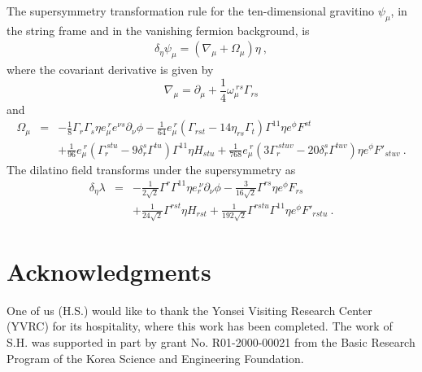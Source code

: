 \documentclass[a4paper,12pt]{article}
\begin{document}
The supersymmetry transformation rule for the ten-dimensional
gravitino $\psi_\mu$, in the string frame and in the vanishing fermion
background, is
\begin{eqnarray}
\delta_\eta \psi_\mu =  (\nabla_\mu + \Omega_\mu ) \eta~,  
\end{eqnarray} 
where the covariant derivative is given by
$$\nabla_\mu = \partial_\mu + \frac{1}{4} \omega_\mu^{~rs}
\Gamma_{rs}$$ and 
\begin{eqnarray}
\Omega_\mu 
 &=&
   -\frac{1}{8} \Gamma_r \Gamma_s \eta
        e_\mu^{~r} e^{\nu s} \partial_\nu \phi
  -\frac{1}{64} e_\mu^{~r} ( \Gamma_{rst}- 14 \eta_{rs} \Gamma_t)
     \Gamma^{11} \eta e^\phi F^{st}
                                                \nonumber \\
 & & +\frac{1}{96} e_\mu^{~r}
     (\Gamma_r^{~stu}-9 \delta_r^s \Gamma^{tu}) \Gamma^{11} \eta
      H_{stu}
     +\frac{1}{768} e_\mu^{~r}
     ( 3\Gamma_r^{~stuv}-20 \delta_r^s \Gamma^{tuv} ) \eta
     e^\phi F'_{stuv} ~.
\label{dpsi}
\end{eqnarray}
The dilatino field transforms under the supersymmetry as
\begin{eqnarray}
\delta_\eta \lambda
 &=& -\frac{1}{2 \sqrt{2} } \Gamma^r \Gamma^{11} \eta
            e_r^{~\nu} \partial_\nu \phi
    -\frac{3}{16 \sqrt{2} } \Gamma^{rs} \eta e^\phi F_{rs}
                                               \nonumber \\
 & & + \frac{1}{24 \sqrt{2}} \Gamma^{rst} \eta H_{rst}
    + \frac{1}{192 \sqrt{2} } \Gamma^{rstu} \Gamma^{11}
            \eta  e^\phi F'_{rstu} ~.
                                               \label{dlam}
\end{eqnarray}



\section*{Acknowledgments}
One of us (H.S.) would like to thank the Yonsei Visiting Research
Center (YVRC) for its hospitality, where this work has been completed.
The work of S.H. was supported in part by grant No. R01-2000-00021
from the Basic Research Program of the Korea Science and Engineering
Foundation.
\end{document}
